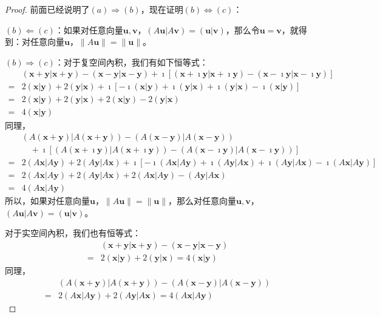 \documentclass[12pt,UTF8,fontset=none]{ctexbook}
\begin{document}
\begin{proof} %
前面已经说明了$(a) \Rightarrow (b)$，现在证明$(b) \Leftrightarrow (c)$：

$(b) \Leftarrow (c)$：如果对任意向量$\mathbf{u}, \mathbf{v}$，$(A\mathbf{u}|A\mathbf{v}) = (\mathbf{u}|\mathbf{v})$，那么令$\mathbf{u} = \mathbf{v}$，就得到：对任意向量$\mathbf{u}$，$\|A\mathbf{u}\| = \|\mathbf{u}\|$。

$(b) \Rightarrow (c)$：对于复空间內积，我们有如下恒等式：
\begin{align*}
    &(\mathbf{x}+\mathbf{y}|\mathbf{x}+\mathbf{y}) - (\mathbf{x}-\mathbf{y}|\mathbf{x}-\mathbf{y}) + \imath \left[(\mathbf{x}+\imath \mathbf{y}|\mathbf{x}+\imath \mathbf{y}) - (\mathbf{x}-\imath \mathbf{y}|\mathbf{x}-\imath \mathbf{y})\right]  \\
    =& 2(\mathbf{x}|\mathbf{y}) + 2(\mathbf{y}|\mathbf{x}) + \imath \left[-\imath (\mathbf{x}|\mathbf{y}) + \imath (\mathbf{y}|\mathbf{x}) + \imath (\mathbf{y}|\mathbf{x}) -\imath (\mathbf{x}|\mathbf{y}) \right]  \\
    =& 2(\mathbf{x}|\mathbf{y}) + 2(\mathbf{y}|\mathbf{x}) + 2(\mathbf{x}|\mathbf{y}) - 2(\mathbf{y}|\mathbf{x})  \\
    =& 4(\mathbf{x}|\mathbf{y}) 
\end{align*}
同理，
\begin{align*}
    &(A(\mathbf{x}+\mathbf{y})|A(\mathbf{x}+\mathbf{y})) - (A(\mathbf{x}-\mathbf{y})|A(\mathbf{x}-\mathbf{y}))  \\
    &\quad + \imath \left[(A(\mathbf{x}+\imath \mathbf{y})|A(\mathbf{x}+\imath \mathbf{y})) - (A(\mathbf{x}-\imath \mathbf{y})|A(\mathbf{x}-\imath \mathbf{y}))\right]  \\
    =& 2(A\mathbf{x}|A\mathbf{y}) + 2(A\mathbf{y}|A\mathbf{x}) + \imath \left[-\imath (A\mathbf{x}|A\mathbf{y}) + \imath (A\mathbf{y}|A\mathbf{x}) + \imath (A\mathbf{y}|A\mathbf{x}) -\imath (A\mathbf{x}|A\mathbf{y}) \right]  \\
    =& 2(A\mathbf{x}|A\mathbf{y}) + 2(A\mathbf{y}|A\mathbf{x}) + 2(A\mathbf{x}|A\mathbf{y}) - (A\mathbf{y}|A\mathbf{x})  \\
    =& 4(A\mathbf{x}|A\mathbf{y}) 
\end{align*}
所以，如果对任意向量$\mathbf{u}$，$\|A\mathbf{u}\| = \|\mathbf{u}\|$，那么对任意向量$\mathbf{u}, \mathbf{v}$，$(A\mathbf{u}|A\mathbf{v}) = (\mathbf{u}|\mathbf{v})$。

对于实空间內积，我们也有恒等式：
\begin{align*}
    &(\mathbf{x}+\mathbf{y}|\mathbf{x}+\mathbf{y}) - (\mathbf{x}-\mathbf{y}|\mathbf{x}-\mathbf{y})  \\
    =& 2(\mathbf{x}|\mathbf{y}) + 2(\mathbf{y}|\mathbf{x}) = 4(\mathbf{x}|\mathbf{y}) 
\end{align*}
同理，
\begin{align*}
    &(A(\mathbf{x}+\mathbf{y})|A(\mathbf{x}+\mathbf{y})) - (A(\mathbf{x}-\mathbf{y})|A(\mathbf{x}-\mathbf{y}))  \\
    =& 2(A\mathbf{x}|A\mathbf{y}) + 2(A\mathbf{y}|A\mathbf{x}) = 4(A\mathbf{x}|A\mathbf{y}) 
\end{align*}


\end{proof}
\end{document}
